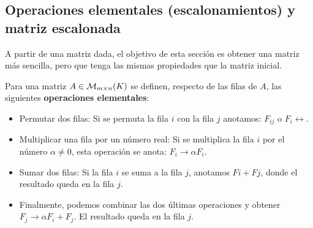 \subsection{Operaciones elementales (escalonamientos) y matriz escalonada}

A partir de una matriz dada, el objetivo de esta secci\'on es obtener una matriz m\'as sencilla, pero que tenga las mismas propiedades que la matriz inicial.


Para una matriz $ A \in \mathcal{M}_{m\times n} (K)$ se definen, respecto de las filas de $A$, las siguientes \textbf{operaciones elementales}:
\begin{itemize}
    \item Permutar dos filas: Si se permuta la fila $i$ con la fila $j$ anotamos: $F_{i j}$ o $F_i\longleftrightarrow$.
    \item Multiplicar una fila por un número real: Si se multiplica la fila $i$ por el número $\alpha \neq 0$, esta operación
se anota: $F_i\longrightarrow\alpha  F_i$.
    \item Sumar dos filas: Si la fila $i$ se suma a la fila $j$, anotamos $F i + F j$, donde el resultado queda en la fila $j$.
    \item Finalmente, podemos combinar las dos últimas operaciones y obtener $F_j\longrightarrow \alpha  F_i + F_j$. El resultado queda en la fila $j$.
\end{itemize}


